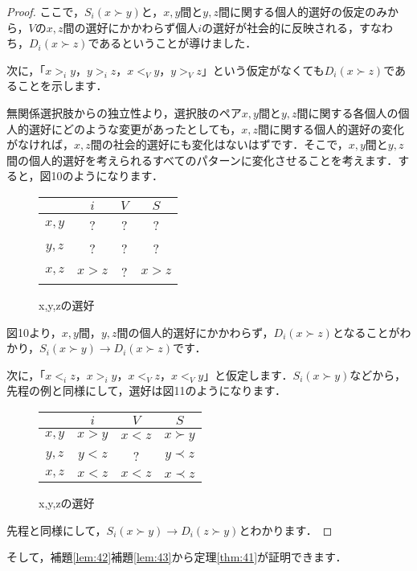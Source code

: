 \begin{proof}
ここで，$S_i(x \succ y)$と，$x,y$間と$y,z$間に関する個人的選好の仮定のみから，$V$の$x,z$間の選好にかかわらず個人$i$の選好が社会的に反映される，すなわち，$D_i(x \succ z)$であるということが導けました．

次に，「$x >_i y$，$y >_i z$，$x <_V y$，$y >_V z$」という仮定がなくても$D_i(x \succ z)$であることを示します．

無関係選択肢からの独立性より，選択肢のペア$x,y$間と$y,z$間に関する各個人の個人的選好にどのような変更があったとしても，$x,z$間に関する個人的選好の変化がなければ，$x,z$間の社会的選好にも変化はないはずです．そこで，$x,y$間と$y,z$間の個人的選好を考えられるすべてのパターンに変化させることを考えます．すると，図10のようになります．

\begin{figure}[!h]
    \centering
    \begin{tabular}{|c|c|c|c|} \hline
        & $i$ & $V$ & $S$ \\ \hline
        $x,y$ &    ?    &    ?    &    ?    \\ \hline
        $y,z$ &    ?    &    ?    &    ?    \\ \hline
        $x,z$ & $x > z$ &    ?    & $x > z$ \\ \hline
    \end{tabular}
    \caption{x,y,zの選好}
\end{figure}
図10より，$x,y$間，$y,z$間の個人的選好にかかわらず，$D_i(x \succ z)$となることがわかり，$S_i(x \succ y) \to D_i(x \succ z)$です．

次に，「$x <_i z$，$x >_i y$，$x <_V z $，$x <_V y$」と仮定します．$S_i(x \succ y)$などから，先程の例と同様にして，選好は図11のようになります．
\begin{figure}[!h]
    \centering
    \begin{tabular}{|c|c|c|c|} \hline
        & $i$ & $V$ & $S$ \\ \hline
        $x,y$ & $x > y$ & $x < z$ & $x \succ y$ \\ \hline
        $y,z$ & $y < z$ &    ?    & $y \prec z$ \\ \hline
        $x,z$ & $x < z$ & $x < z$ & $x \prec z$ \\ \hline
    \end{tabular}
    \caption{x,y,zの選好}
\end{figure}

先程と同様にして，$S_i(x \succ y) \to D_i(z \succ y)$とわかります．
\end{proof}

そして，補題\ref{lem:42}補題\ref{lem:43}から定理\ref{thm:41}が証明できます．

